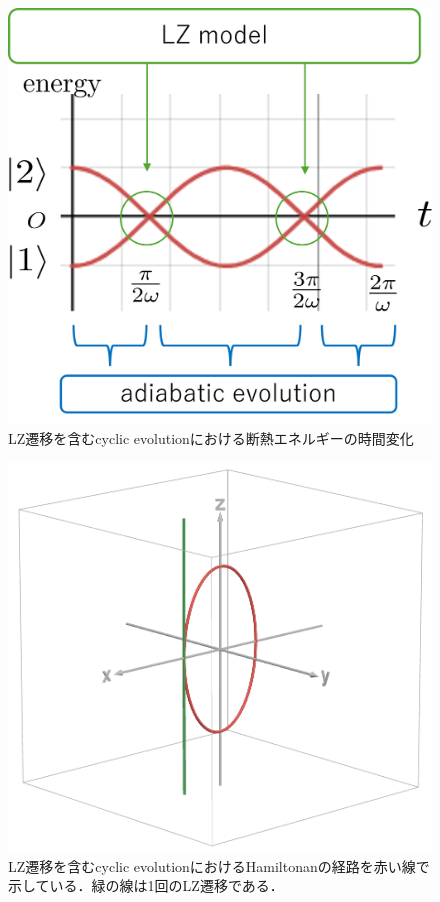 \documentclass[a4paper, titlepage]{jsreport}
\begin{document}
\begin{figure}[htbp]
  \centering
  \includegraphics[scale=0.7]{figures/CE_LZ.png}
  \caption{LZ遷移を含むcyclic evolutionにおける断熱エネルギーの時間変化}
  \label{fig:CE_LZ}
\end{figure}

\begin{figure}[htbp]
  \centering
  \includegraphics[scale=0.3]{figures/CE_LZ_Pauli.png}
  \caption{LZ遷移を含むcyclic evolutionにおけるHamiltonanの経路を赤い線で示している．緑の線は1回のLZ遷移である．}
  \label{fig:CE_LZ_Pauli}
\end{figure}
\end{document}
